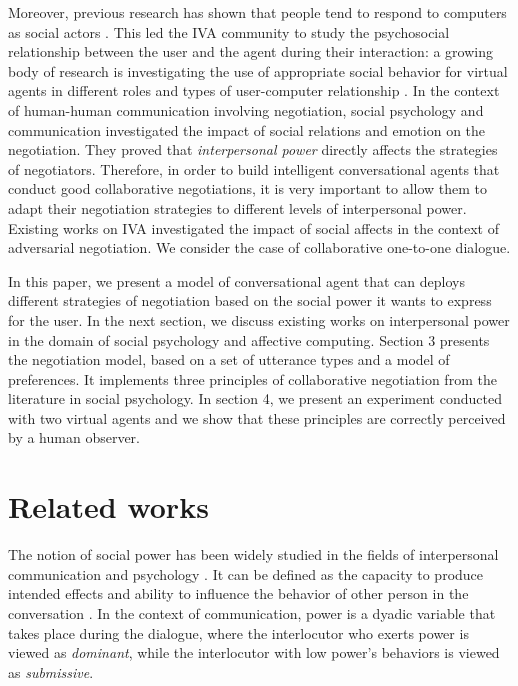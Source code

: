 \documentclass{llncs}
\begin{document}
	Moreover, previous research has shown that people tend to respond to computers as social actors \cite{bickmore2005establishing}. This led the IVA community to study the psychosocial relationship between the user and the agent during their interaction: a growing body of research is investigating the use of appropriate social behavior for virtual agents in different roles and types of user-computer relationship \cite{bickmore2005s,bickmore2005establishing,kidd2005sociable}. In the context of human-human communication involving negotiation, social psychology and communication \cite{dunbar2005perceptions,de1995impact} investigated the impact of social relations and emotion on the negotiation. They proved that  \emph{interpersonal power} directly affects the strategies of negotiators. Therefore, in order to build intelligent conversational agents that conduct good collaborative negotiations, it is very important to allow them to adapt their negotiation strategies to different levels of interpersonal power. Existing works on IVA \cite{traum2008multi,de2015humans,de2011effect}investigated the impact of social affects in the context of adversarial negotiation. We consider the case of collaborative one-to-one dialogue.
	
	In this paper, we present a model of conversational agent that can deploys different strategies of negotiation based on the social power it wants to express for the user. In the next section, we discuss existing works on interpersonal power in the domain of social psychology and affective computing. Section 3 presents the negotiation model, based on a set of utterance types and a model of preferences. It implements three principles of collaborative negotiation from the literature in social psychology. In section 4, we present an experiment conducted with two virtual agents and we show that these principles are correctly perceived by a human observer.	
	
	\section{Related works}
	The notion of social power has been widely studied in the fields of interpersonal communication and psychology \cite{kecskes2013research}. It can be defined as the capacity to produce intended effects and ability to influence the behavior of other person in the conversation \cite{dunbar2005perceptions}. In the context of communication, power is a dyadic variable that takes place during the dialogue, where the interlocutor who exerts power is viewed as \textit{dominant}, while the interlocutor with low power's behaviors is viewed as \textit{submissive}. 
\end{document}

